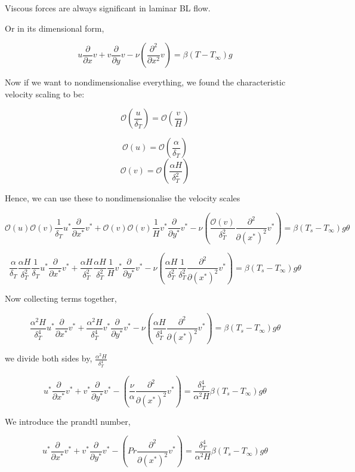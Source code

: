 \documentclass[11pt]{article}
\begin{document}
Viscous forces are always significant in laminar BL flow.

Or in its dimensional form,

$$ u \frac{\partial}{\partial x} v +  v \frac{\partial}{\partial y} v  - \nu ( \frac{\partial^2}{\partial x^2} v) = \beta(T-T_\infty)  g$$


Now if we want to nondimensionalise everything, we found the characteristic velocity scaling to be:

$$\mathcal{O}(\frac{u}{\delta_T}) = \mathcal{O}(\frac{v}{H})$$

$$ \mathcal{O}( u ) = \mathcal{O}(\frac{\alpha}{\delta_T})$$
$$ \mathcal{O}(v ) = \mathcal{O}( \frac{\alpha H}{\delta_T^2})$$

Hence, we can use these to nondimensionalise the velocity scales

$$  \mathcal{O}(u) \mathcal{O}(v) \frac{1}{\delta_T} u^* \frac{\partial}{\partial x^*} v^* +  \mathcal{O}(v) \mathcal{O}(v) \frac{1}{H} v^* \frac{\partial}{\partial y^*} v^*  -\nu ( \frac{\mathcal{O}(v)}{\delta_T^2} \frac{\partial^2}{\partial (x^*)^2} v^* ) = \beta(T_s-T_\infty) g \theta $$

$$  \frac{\alpha}{\delta_T} \frac{\alpha H}{\delta_T^2} \frac{1}{\delta_T} u^* \frac{\partial}{\partial x^*} v^* +  \frac{\alpha H}{\delta_T^2} \frac{\alpha H}{\delta_T^2} \frac{1}{H} v^* \frac{\partial}{\partial y^*} v^*  -\nu ( \frac{\alpha H}{\delta_T^2} \frac{1}{\delta_T^2} \frac{\partial^2}{\partial (x^*)^2} v^* ) = \beta(T_s-T_\infty) g \theta $$

Now collecting terms together,

$$  \frac{\alpha^2 H}{\delta_T^4}  u^* \frac{\partial}{\partial x^*} v^* +  \frac{\alpha^2 H}{\delta_T^4} v^* \frac{\partial}{\partial y^*} v^*  -\nu ( \frac{\alpha H}{\delta_T^4} \frac{\partial^2}{\partial (x^*)^2} v^* ) = \beta(T_s-T_\infty) g \theta $$


we divide both sides by, $\frac{\alpha^2 H}{\delta_T^4}$

$$   u^* \frac{\partial}{\partial x^*} v^* +    v^* \frac{\partial}{\partial y^*} v^*  -  ( \frac{\nu}{\alpha} \frac{\partial^2}{\partial (x^*)^2} v^* ) = \frac{\delta_T^4}{\alpha^2 H} \beta(T_s-T_\infty) g \theta $$

We introduce the prandtl number,

$$   u^* \frac{\partial}{\partial x^*} v^* +    v^* \frac{\partial}{\partial y^*} v^*  -  ( Pr \frac{\partial^2}{\partial (x^*)^2} v^* ) = \frac{\delta_T^4}{\alpha^2 H} \beta(T_s-T_\infty) g \theta $$
\end{document}
